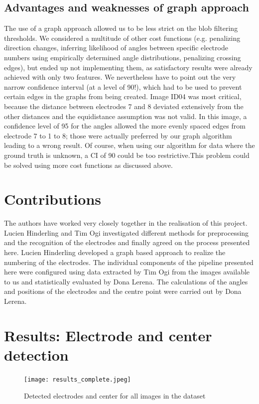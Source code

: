 \documentclass[a4paper, 10pt, twocolumn]{article}
\begin{document}
\subsection{Advantages and weaknesses of graph approach}
The use of a graph approach allowed us to be less strict on the blob filtering thresholds. We considered a multitude of other cost functions (e.g. penalizing direction changes, inferring likelihood of angles between specific electrode numbers using empirically determined angle distributions, penalizing crossing edges), but ended up not implementing them, as satisfactory results were already achieved with only two features.
We nevertheless have to point out the very narrow confidence interval (at a level of 90!), which had to be used to prevent certain edges in the graphs from being created. Image ID04 was most critical, because the distance between electrodes 7 and 8 deviated extensively from the other distances and the equidistance assumption was not valid. In this image, a confidence level of 95 for the angles allowed the more evenly spaced edges from electrode 7 to 1 to 8; those were actually preferred by our graph algorithm leading to a wrong result. Of course, when using our algorithm for data where the ground truth is unknown, a CI of 90 could be too restrictive.This problem could be solved using more cost functions as discussed above. 




\section{Contributions}
The authors have worked very closely together in the realisation of this project. Lucien Hinderling and Tim Ogi investigated different methods for preprocessing and the recognition of the electrodes and finally agreed on the process presented here. Lucien Hinderling developed a graph based approach to realize the numbering of the electrodes. The individual components of the pipeline presented here were configured using data extracted by Tim Ogi from the images available to us and statistically evaluated by Dona Lerena. The calculations of the angles and positions of the electrodes and the centre point were carried out by Dona Lerena.




\appendix
\section{Results: Electrode and center detection}
\begin{figure}[ht]
	\centering
  \texttt{[image: results\_complete.jpeg]} %
	\caption{Detected electrodes and center for all images in the dataset}
	\label{results_complete}
\end{figure}
\end{document}
